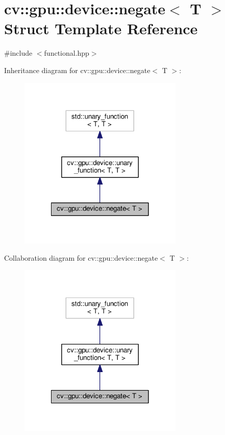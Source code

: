 \hypertarget{structcv_1_1gpu_1_1device_1_1negate}{\section{cv\-:\-:gpu\-:\-:device\-:\-:negate$<$ T $>$ Struct Template Reference}
\label{structcv_1_1gpu_1_1device_1_1negate}
}


{\ttfamily \#include $<$functional.\-hpp$>$}



Inheritance diagram for cv\-:\-:gpu\-:\-:device\-:\-:negate$<$ T $>$\-:\nopagebreak
\begin{figure}[H]
\begin{center}
\leavevmode
\includegraphics[width=222pt]{structcv_1_1gpu_1_1device_1_1negate__inherit__graph}
\end{center}
\end{figure}


Collaboration diagram for cv\-:\-:gpu\-:\-:device\-:\-:negate$<$ T $>$\-:\nopagebreak
\begin{figure}[H]
\begin{center}
\leavevmode
\includegraphics[width=222pt]{structcv_1_1gpu_1_1device_1_1negate__coll__graph}
\end{center}
\end{figure}
